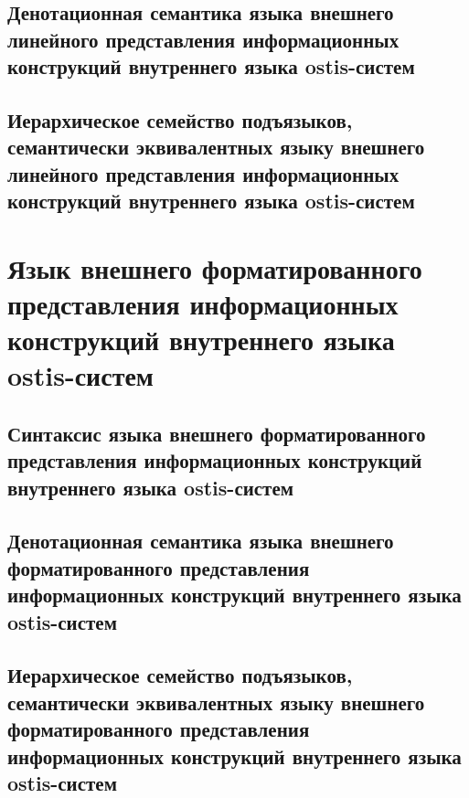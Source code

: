 \subsection{Денотационная семантика языка внешнего линейного представления информационных конструкций внутреннего языка ostis-систем}
\subsection{Иерархическое семейство подъязыков, семантически эквивалентных языку внешнего линейного представления информационных конструкций внутреннего языка ostis-систем}
\section{Язык внешнего форматированного представления информационных конструкций внутреннего языка ostis-систем}
\subsection{Синтаксис языка внешнего форматированного представления информационных конструкций внутреннего языка ostis-систем}
\subsection{Денотационная семантика языка внешнего форматированного представления информационных конструкций внутреннего языка ostis-систем}
\subsection{Иерархическое семейство подъязыков, семантически эквивалентных языку внешнего форматированного представления информационных конструкций внутреннего языка ostis-систем}

%